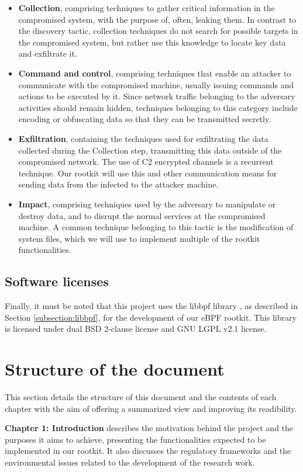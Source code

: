 \begin{itemize}
\item \textbf{Collection}, comprising techniques to gather critical information in the compromised system, with the purpose of, often, leaking them. In contrast to the discovery tactic, collection techniques do not search for possible targets in the compromised system, but rather use this knowledge to locate key data and exfiltrate it.
\item \textbf{Command and control}, comprising techniques that enable an attacker to communicate with the compromised machine, usually issuing commands and actions to be executed by it. Since network traffic belonging to the adversary activities should remain hidden, techniques belonging to this category include encoding or obfuscating data so that they can be transmitted secretly.
\item \textbf{Exfiltration}, containing the techniques used for exfiltrating the data collected during the Collection step, transmitting this data outside of the compromised network. The use of C2 encrypted channels is a recurrent technique. Our rootkit will use this and other communication means for sending data from the infected to the attacker machine.
\item \textbf{Impact}, comprising techniques used by the adversary to manipulate or destroy data, and to disrupt the normal services at the compromised machine. A common technique belonging to this tactic is the modification of system files, which we will use to implement multiple of the rootkit functionalities.
\end{itemize}

\subsection{Software licenses}
Finally, it must be noted that this project uses the libbpf library
\cite{libbpf_github}, as described in Section \ref{subsection:libbpf}, for
the development of our eBPF rootkit. This library is licensed under dual
BSD 2-clause license and GNU LGPL v2.1 license.


\section{Structure of the document}
This section details the structure of this document and the contents of each chapter with the aim of offering a summarized view and improving its readibility.

\textbf{Chapter 1: Introduction} describes the motivation behind the project and the purposes it aims to achieve, presenting the functionalities expected to be implemented in our rootkit. It also discusses the regulatory frameworks and the environmental issues related to the development of the research work.


